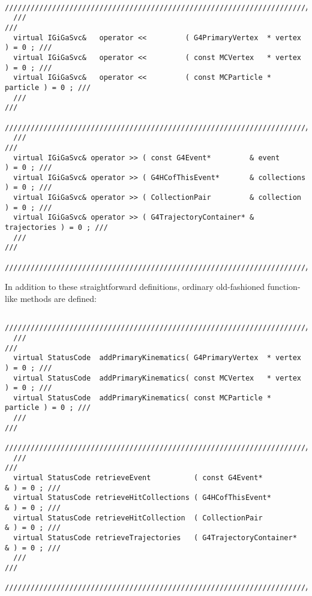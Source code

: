 \documentclass[nfss,times,12pt,a4paper]{article}
\begin{document}
{\begin{tiny}
\begin{verbatim}
  /////////////////////////////////////////////////////////////////////////////////
  ///                                                                           ///
  virtual IGiGaSvc&   operator <<         ( G4PrimaryVertex  * vertex   ) = 0 ; /// 
  virtual IGiGaSvc&   operator <<         ( const MCVertex   * vertex   ) = 0 ; /// 
  virtual IGiGaSvc&   operator <<         ( const MCParticle * particle ) = 0 ; /// 
  ///                                                                           ///
  /////////////////////////////////////////////////////////////////////////////////
  ///                                                                           ///
  virtual IGiGaSvc& operator >> ( const G4Event*         & event        ) = 0 ; /// 
  virtual IGiGaSvc& operator >> ( G4HCofThisEvent*       & collections  ) = 0 ; /// 
  virtual IGiGaSvc& operator >> ( CollectionPair         & collection   ) = 0 ; ///
  virtual IGiGaSvc& operator >> ( G4TrajectoryContainer* & trajectories ) = 0 ; ///
  ///                                                                           ///
  /////////////////////////////////////////////////////////////////////////////////
\end{verbatim}  
\end{tiny}

In addition to these straightforward definitions, ordinary 
old-fashioned function-like methods are defined:  
\begin{tiny}
\begin{verbatim}
  /////////////////////////////////////////////////////////////////////////////////
  ///                                                                           ///
  virtual StatusCode  addPrimaryKinematics( G4PrimaryVertex  * vertex   ) = 0 ; /// 
  virtual StatusCode  addPrimaryKinematics( const MCVertex   * vertex   ) = 0 ; /// 
  virtual StatusCode  addPrimaryKinematics( const MCParticle * particle ) = 0 ; /// 
  ///                                                                           ///
  /////////////////////////////////////////////////////////////////////////////////
  ///                                                                           ///
  virtual StatusCode retrieveEvent          ( const G4Event*          & ) = 0 ; ///
  virtual StatusCode retrieveHitCollections ( G4HCofThisEvent*        & ) = 0 ; ///
  virtual StatusCode retrieveHitCollection  ( CollectionPair          & ) = 0 ; ///
  virtual StatusCode retrieveTrajectories   ( G4TrajectoryContainer*  & ) = 0 ; ///
  ///                                                                           ///
  /////////////////////////////////////////////////////////////////////////////////
\end{verbatim}  
\end{tiny}

}
\end{document}
